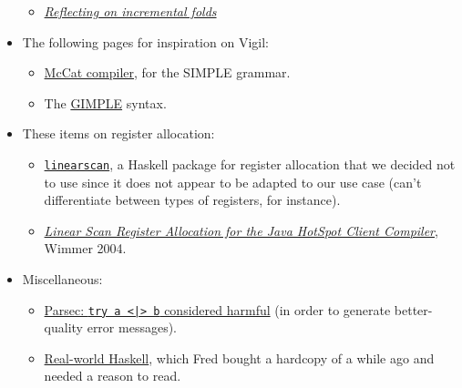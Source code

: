 \documentclass[letterpaper,11pt]{article}
\begin{document}
\begin{itemize}
\begin{itemize}
	\item \href{http://comonad.com/reader/2009/incremental-folds/}{\textit{Reflecting on incremental folds}}
	\end{itemize}
\item The following pages for inspiration on Vigil:
	\begin{itemize}
	\item \href{https://web.archive.org/web/20040812030043/www-acaps.cs.mcgill.ca/info/McCAT/McCAT.html}{McCat compiler}, for the SIMPLE grammar.
	\item The \href{https://gcc.gnu.org/onlinedocs/gccint/GIMPLE.html#GIMPLE}{GIMPLE} syntax.
	\end{itemize}
\item These items on register allocation:
	\begin{itemize}
	\item \href{https://hackage.haskell.org/package/linearscan}{\texttt{linearscan}}, a Haskell package for register allocation that we decided not to use since it does not appear to be adapted to our use case (can't differentiate between types of registers, for instance).
	\item \href{http://www.christianwimmer.at/Publications/Wimmer04a/Wimmer04a.pdf}{\emph{Linear Scan Register Allocation
	for the Java HotSpot Client Compiler}}, Wimmer 2004.
	\end{itemize}
 
\item Miscellaneous:
	\begin{itemize}
	\item \href{http://blog.ezyang.com/2014/05/parsec-try-a-or-b-considered-harmful/}{Parsec: \texttt{try a <|> b} considered harmful} (in order to generate better-quality error messages).
	\item
	\href{http://book.realworldhaskell.org/read}{Real-world Haskell}, which Fred bought a hardcopy of a while ago and needed a reason to read.
	\end{itemize}
\end{itemize}
\end{document}
